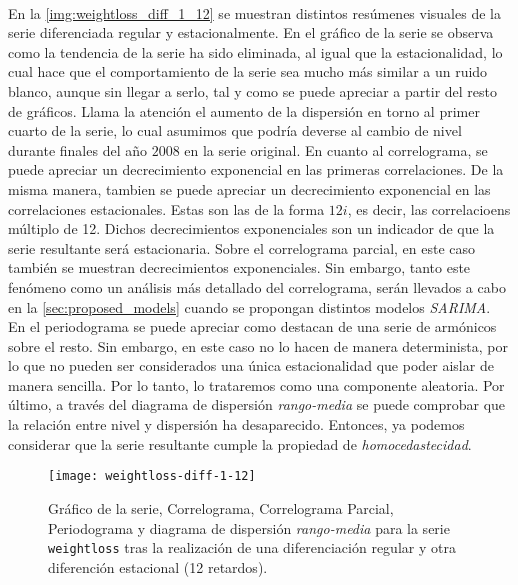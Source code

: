 \documentclass[a4paper, spanish]{article}
\begin{document}
        \paragraph{}
        En la \autoref{img:weightloss_diff_1_12} se muestran distintos resúmenes visuales de la serie diferenciada regular y estacionalmente. En el gráfico de la serie se observa como la tendencia de la serie ha sido eliminada, al igual que la estacionalidad, lo cual hace que el comportamiento de la serie sea mucho más similar a un ruido blanco, aunque sin llegar a serlo, tal y como se puede apreciar a partir del resto de gráficos. Llama la atención el aumento de la dispersión en torno al primer cuarto de la serie, lo cual asumimos que podría deverse al cambio de nivel durante finales del año $2008$ en la serie original. En cuanto al correlograma, se puede apreciar un decrecimiento exponencial en las primeras correlaciones. De la misma manera, tambien se puede apreciar un decrecimiento exponencial en las correlaciones estacionales. Estas son las de la forma $12i$, es decir, las correlacioens múltiplo de 12. Dichos decrecimientos exponenciales son un indicador de que la serie resultante será estacionaria. Sobre el correlograma parcial, en este caso también se muestran decrecimientos exponenciales. Sin embargo, tanto este fenómeno como un análisis más detallado del correlograma, serán llevados a cabo en la \autoref{sec:proposed_models} cuando se propongan distintos modelos \emph{SARIMA}. En el periodograma se puede apreciar como destacan de una serie de armónicos sobre el resto. Sin embargo, en este caso no lo hacen de manera determinista, por lo que no pueden ser considerados una única estacionalidad que poder aislar de manera sencilla. Por lo tanto, lo trataremos como una componente aleatoria. Por último, a través del diagrama de dispersión \emph{rango-media} se puede comprobar que la relación entre nivel y dispersión ha desaparecido. Entonces, ya podemos considerar que la serie resultante cumple la propiedad de \emph{homocedastecidad}.

        \begin{figure}[htb!]
          \centering
          \texttt{[image: weightloss-diff-1-12]}
          \caption{Gráfico de la serie, Correlograma, Correlograma Parcial, Periodograma y diagrama de dispersión \emph{rango-media} para la serie \texttt{weightloss} tras la realización de una diferenciación regular y otra diferención estacional (12 retardos).}
          \label{img:weightloss_diff_1_12}
        \end{figure}
\end{document}

